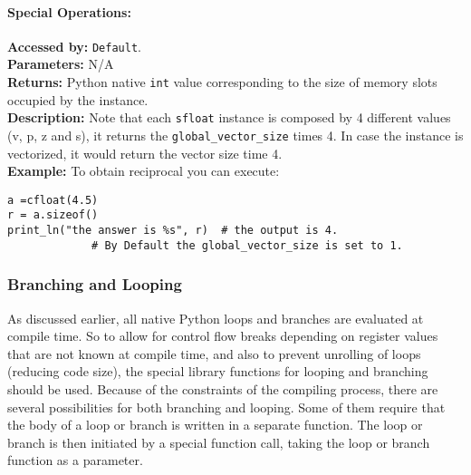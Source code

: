 \paragraph{Special Operations:}
                        \textbf{Accessed by:} \verb|Default|. \\
                        \textbf{Parameters:} N/A \\
                        \textbf{Returns:}
                                 Python native \verb|int| value corresponding to the size of memory slots occupied by the instance. \\
                        \textbf{Description:}
                                Note that each \verb|sfloat| instance is composed by 4 
                                different values (v, p, z and s), 
                                it returns the \verb|global_vector_size| times 4. 
                                In case the instance is vectorized, 
                                it would return the vector size time 4.\\
                \textbf{Example:}
                    To obtain reciprocal you can execute:
\begin{lstlisting}
a =cfloat(4.5)             
r = a.sizeof()
print_ln("the answer is %s", r)  # the output is 4. 
			 # By Default the global_vector_size is set to 1.
\end{lstlisting}

\subsubsection{Branching and Looping}
As discussed earlier, all native Python loops and branches are evaluated at
compile time. So to allow for control flow breaks depending on register values
that are not known at compile time, and also to prevent unrolling of loops
(reducing code size), the special
library functions for looping and branching should be used.
Because of the constraints of the compiling process, there are several
possibilities for both branching and looping.
Some of them require that the body of a loop or branch is written
in a separate function. The loop or branch is then initiated by a special
function call, taking the loop or branch function as a parameter.

